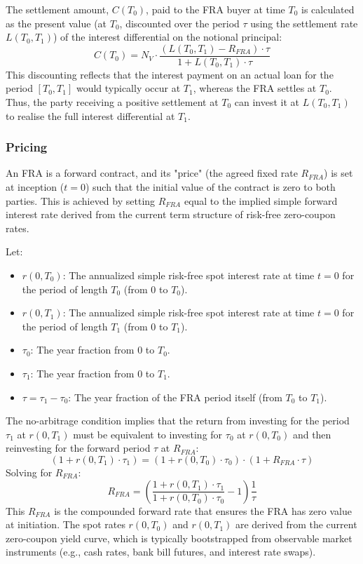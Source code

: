 \documentclass[11pt, a4paper, british]{article}
\begin{document}
The settlement amount, $C(T_0)$, paid to the FRA buyer at time $T_0$ is calculated as the present value (at $T_0$, discounted over the period $\tau$ using the settlement rate $L(T_0, T_1)$) of the interest differential on the notional principal:
\begin{equation}
 C(T_0) = N_V \cdot \frac{(L(T_0, T_1) - R_{FRA}) \cdot \tau}{1 + L(T_0, T_1) \cdot \tau}
 \label{eq:FRASettlement_rigorous}
\end{equation}
This discounting reflects that the interest payment on an actual loan for the period $[T_0, T_1]$ would typically occur at $T_1$, whereas the FRA settles at $T_0$. Thus, the party receiving a positive settlement at $T_0$ can invest it at $L(T_0, T_1)$ to realise the full interest differential at $T_1$.


\subsubsection{Pricing}
An FRA is a forward contract, and its "price" (the agreed fixed rate $R_{FRA}$) is set at inception ($t=0$) such that the initial value of the contract is zero to both parties. This is achieved by setting $R_{FRA}$ equal to the implied simple forward interest rate derived from the current term structure of risk-free zero-coupon rates.

Let:
\begin{itemize}
 \item $r(0, T_0)$: The annualized simple risk-free spot interest rate at time $t=0$ for the period of length $T_0$ (from $0$ to $T_0$).
 \item $r(0, T_1)$: The annualized simple risk-free spot interest rate at time $t=0$ for the period of length $T_1$ (from $0$ to $T_1$).
 \item $\tau_0$: The year fraction from $0$ to $T_0$.
 \item $\tau_1$: The year fraction from $0$ to $T_1$.
 \item $\tau = \tau_1 - \tau_0$: The year fraction of the FRA period itself (from $T_0$ to $T_1$).
\end{itemize}
The no-arbitrage condition implies that the return from investing for the period $\tau_1$ at $r(0, T_1)$ must be equivalent to investing for $\tau_0$ at $r(0, T_0)$ and then reinvesting for the forward period $\tau$ at $R_{FRA}$:
\begin{equation}
 (1 + r(0, T_1) \cdot \tau_1) = (1 + r(0, T_0) \cdot \tau_0) \cdot (1 + R_{FRA} \cdot \tau)
\end{equation}
Solving for $R_{FRA}$:
\begin{equation}
 R_{FRA} = \left( \frac{1 + r(0, T_1) \cdot \tau_1}{1 + r(0, T_0) \cdot \tau_0} - 1 \right) \frac{1}{\tau}
 \label{eq:fra_rate_simple_rigorous}
\end{equation}
This $R_{FRA}$ is the compounded forward rate that ensures the FRA has zero value at initiation. The spot rates $r(0, T_0)$ and $r(0, T_1)$ are derived from the current zero-coupon yield curve, which is typically bootstrapped from observable market instruments (e.g., cash rates, bank bill futures, and interest rate swaps).
\end{document}
